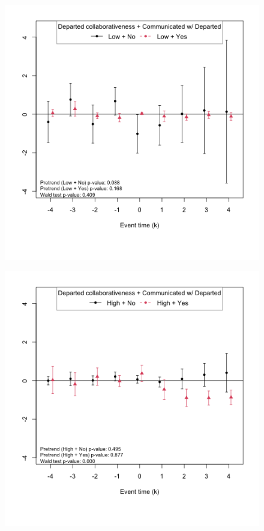 \begin{figure}
\begin{minipage}[b]{0.48\textwidth}
        \includegraphics[width=\textwidth]{temp/output/collab_imp/inv0_cs_norm_prs_opened_dept_never_comm_predep_Low.png}
    \end{minipage}
    \begin{minipage}[b]{0.48\textwidth}
        \centering
         \label{fig:predep_prs_opened_high_collab_comm_ext_marg_inv1}
        \includegraphics[width=\textwidth]{temp/output/collab_imp/inv1_cs_norm_prs_opened_dept_never_comm_predep_High.png}

\end{minipage}
\end{figure}
